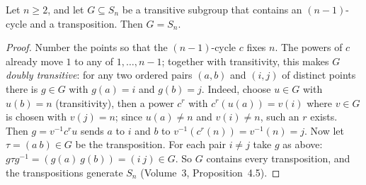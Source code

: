 \begin{lemma}\label{conjectures:lem:sngen}
Let $n\ge2$, and let $G\subseteq S_n$ be a transitive subgroup that contains an $(n-1)$-cycle and a transposition. Then $G=S_n$.
\end{lemma}
\begin{proof}
Number the points so that the $(n-1)$-cycle $c$ fixes $n$. The powers of $c$ already move $1$ to any of $1,\dots,n-1$; together with transitivity, this
makes $G$ \emph{doubly transitive}: for any two ordered pairs $(a,b)$ and $(i,j)$ of distinct points there is $g\in G$ with $g(a)=i$ and $g(b)=j$. Indeed,
choose $u\in G$ with $u(b)=n$ (transitivity), then a power $c^r$ with $c^r(u(a))=v(i)$ where $v\in G$ is chosen with $v(j)=n$; since $u(a)\ne n$ and
$v(i)\ne n$, such an $r$ exists. Then $g=v^{-1}c^ru$ sends $a$ to $i$ and $b$ to $v^{-1}(c^r(n))=v^{-1}(n)=j$. Now let $\tau=(a\ b)\in G$ be the
transposition. For each pair $i\ne j$ take $g$ as above: $g\tau g^{-1}=(g(a)\ g(b))=(i\ j)\in G$. So $G$ contains every transposition, and the
transpositions generate $S_n$ (Volume~3, Proposition~4.5).
\end{proof}

